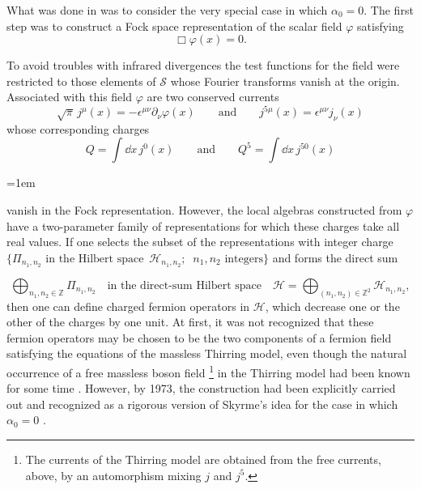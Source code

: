 What was done in \cite{pct-app-72} was to consider the very special case in which
$\alpha_0=0$.  The first step was to construct a Fock space representation of
the scalar field $\varphi$ satisfying
\begin{equation*}
  \Box\varphi(x)=0.
\end{equation*}

To avoid troubles with infrared divergences the test functions for the field
were restricted to those elements of $\mathcal S$ whose Fourier transforms
vanish at the origin.  Associated with this field $\varphi$ are two
conserved currents
\begin{equation*}
  \sqrt{\pi}\,j^\mu(x)=-\epsilon^{\mu\nu}\partial_\nu\varphi(x)
  \qquad\text{and}\qquad
  j^{5\mu}(x)=\epsilon^{\mu\nu}j_\nu(x)
\end{equation*}
whose corresponding charges
\begin{equation*}
  Q=\int\dd x\,j^0(x)
  \qquad\text{and}\qquad
  Q^5=\int\dd x\,j^{50}(x)
\end{equation*}

\begingroup
\emergencystretch=1em
\raggedright
vanish in the Fock representation.  However, the local algebras constructed
from $\varphi$ have a two-parameter family of representations for which these
charges take all real values.  If one selects the subset of the
representations with integer charge\linebreak
$\{\Pi_{n_1,n_2}\text{ in the Hilbert space}$%
$\,\mathcal H_{n_1,n_2};$%
$\ n_1,n_2\text{ integers}\}$
and forms the direct sum
\par
\endgroup
\begin{equation*}
  \bigoplus_{n_1,n_2\in\mathbb Z}\Pi_{n_1,n_2}
  \quad\text{in the direct-sum Hilbert space}\quad
  \mathcal H=\bigoplus_{(n_1,n_2)\in\mathbb Z^2}\mathcal H_{n_1,n_2},
\end{equation*}
then one can define charged fermion operators in $\mathcal H$, which
decrease one or the other of the charges by one unit.  At first, it was not
recognized that these fermion operators may be chosen to be the two
components of a fermion field satisfying the equations of the massless
Thirring model, even though the natural occurrence of a free massless boson
field\begingroup
\renewcommand{\thefootnote}{\ensuremath{\dagger}}%
\footnote{%
The currents of the Thirring model are obtained from the free currents,
above, by an automorphism mixing $j$ and $j^5$.
}\endgroup
in the Thirring model had been known for some time \cite{pct-app-74}.  However, by 1973,
the construction had been explicitly carried out and recognized as a
rigorous version of Skyrme's idea for the case in which $\alpha_0=0$ \cite{pct-app-74,pct-app-75}.

